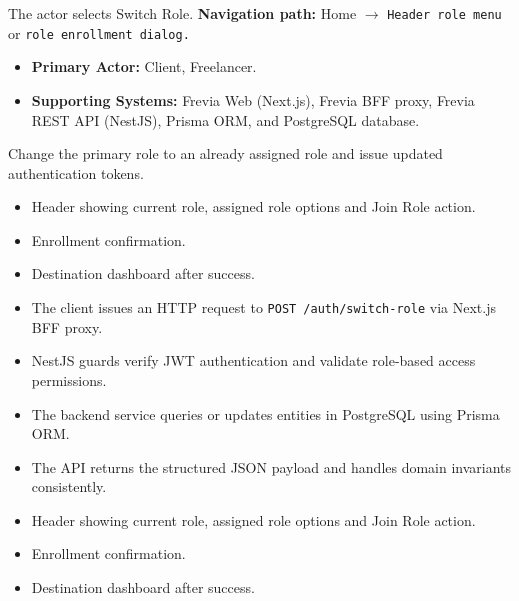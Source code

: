 The actor selects Switch Role.\newline
\textbf{Navigation path:} Home $\rightarrow$ \texttt{Header role menu} or \texttt{role enrollment dialog.}


\begin{itemize}[leftmargin=1.6em,topsep=3pt,itemsep=2pt,parsep=0pt,label=$\bullet$]
    \item \textbf{Primary Actor:} Client, Freelancer.
    \item \textbf{Supporting Systems:} Frevia Web (Next.js), Frevia BFF proxy, Frevia REST API (NestJS), Prisma ORM, and PostgreSQL database.
\end{itemize}

\noindent Change the primary role to an already assigned role and issue updated authentication tokens.

\begin{itemize}[leftmargin=1.6em,topsep=3pt,itemsep=2pt,parsep=0pt,label=$\bullet$]
    \item Header showing current role, assigned role options and Join Role action.
    \item Enrollment confirmation.
    \item Destination dashboard after success.
\end{itemize}

\begin{itemize}[leftmargin=1.6em,topsep=3pt,itemsep=2pt,parsep=0pt,label=$\bullet$]
    \item The client issues an HTTP request to \texttt{POST /\allowbreak{}auth/\allowbreak{}switch-\allowbreak{}role} via Next.js BFF proxy.
    \item NestJS guards verify JWT authentication and validate role-based access permissions.
    \item The backend service queries or updates entities in PostgreSQL using Prisma ORM.
    \item The API returns the structured JSON payload and handles domain invariants consistently.
\end{itemize}

\begin{itemize}[leftmargin=1.6em,topsep=3pt,itemsep=2pt,parsep=0pt,label=$\bullet$]
    \item Header showing current role, assigned role options and Join Role action.
    \item Enrollment confirmation.
    \item Destination dashboard after success.
\end{itemize}

